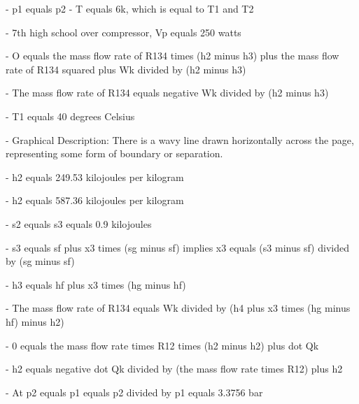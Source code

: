 - p1 equals p2
- T equals 6k, which is equal to T1 and T2

- 7th high school over compressor, Vp equals 250 watts

- O equals the mass flow rate of R134 times (h2 minus h3) plus the mass flow rate of R134 squared plus Wk divided by (h2 minus h3)

- The mass flow rate of R134 equals negative Wk divided by (h2 minus h3)

- T1 equals 40 degrees Celsius

- Graphical Description: There is a wavy line drawn horizontally across the page, representing some form of boundary or separation.

- h2 equals 249.53 kilojoules per kilogram

- h2 equals 587.36 kilojoules per kilogram

- s2 equals s3 equals 0.9 kilojoules

- s3 equals sf plus x3 times (sg minus sf) implies x3 equals (s3 minus sf) divided by (sg minus sf)

- h3 equals hf plus x3 times (hg minus hf)

- The mass flow rate of R134 equals Wk divided by (h4 plus x3 times (hg minus hf) minus h2)

- 0 equals the mass flow rate times R12 times (h2 minus h2) plus dot Qk

- h2 equals negative dot Qk divided by (the mass flow rate times R12) plus h2

- At p2 equals p1 equals p2 divided by p1 equals 3.3756 bar